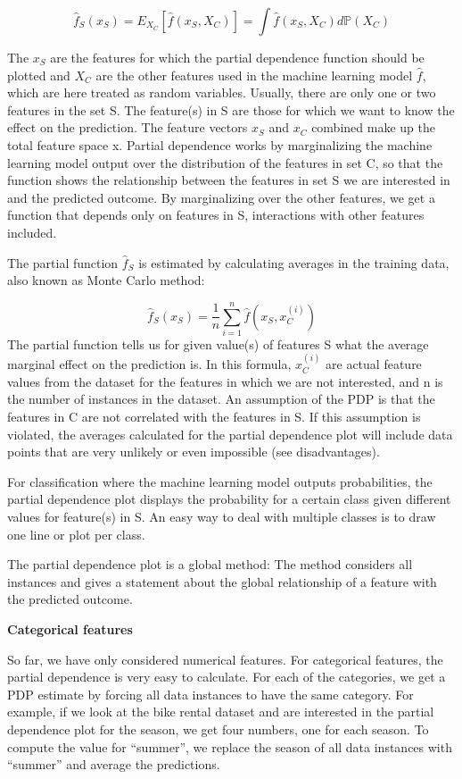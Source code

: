 \documentclass[
  11pt,
]{scrbook}
\begin{document}
\[\hat{f}_S(x_S)=E_{X_C}\left[\hat{f}(x_S,X_C)\right]=\int\hat{f}(x_S,X_C)d\mathbb{P}(X_C)\]

The \(x_S\) are the features for which the partial dependence function should be plotted and \(X_C\) are the other features used in the machine learning model \(\hat{f}\), which are here treated as random variables.
Usually, there are only one or two features in the set S.
The feature(s) in S are those for which we want to know the effect on the prediction.
The feature vectors \(x_S\) and \(x_C\) combined make up the total feature space x.
Partial dependence works by marginalizing the machine learning model output over the distribution of the features in set C, so that the function shows the relationship between the features in set S we are interested in and the predicted outcome.
By marginalizing over the other features, we get a function that depends only on features in S, interactions with other features included.

The partial function \(\hat{f}_S\) is estimated by calculating averages in the training data, also known as Monte Carlo method:

\[\hat{f}_S(x_S)=\frac{1}{n}\sum_{i=1}^n\hat{f}(x_S,x^{(i)}_{C})\]
The partial function tells us for given value(s) of features S what the average marginal effect on the prediction is.
In this formula, \(x^{(i)}_{C}\) are actual feature values from the dataset for the features in which we are not interested, and n is the number of instances in the dataset.
An assumption of the PDP is that the features in C are not correlated with the features in S.
If this assumption is violated, the averages calculated for the partial dependence plot will include data points that are very unlikely or even impossible (see disadvantages).

For classification where the machine learning model outputs probabilities, the partial dependence plot displays the probability for a certain class given different values for feature(s) in S.
An easy way to deal with multiple classes is to draw one line or plot per class.

The partial dependence plot is a global method:
The method considers all instances and gives a statement about the global relationship of a feature with the predicted outcome.

\textbf{Categorical features}

So far, we have only considered numerical features.
For categorical features, the partial dependence is very easy to calculate.
For each of the categories, we get a PDP estimate by forcing all data instances to have the same category.
For example, if we look at the bike rental dataset and are interested in the partial dependence plot for the season, we get four numbers, one for each season.
To compute the value for ``summer'', we replace the season of all data instances with ``summer'' and average the predictions.
\end{document}
